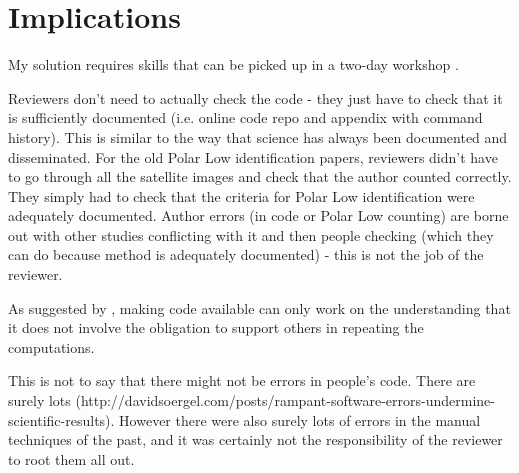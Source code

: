 \section{Implications}

My solution requires skills that can be picked up in a two-day workshop \citep{Wilson2014}.

Reviewers don't need to actually check the code - they just have to check that it is sufficiently documented (i.e. online code repo and appendix with command history). This is similar to the way that science has always been documented and disseminated. For the old Polar Low identification papers, reviewers didn't have to go through all the satellite images and check that the author counted correctly. They simply had to check that the criteria for Polar Low identification were adequately documented. Author errors (in code or Polar Low counting) are borne out with other studies conflicting with it and then people checking (which they can do because method is adequately documented) - this is not the job of the reviewer.

As suggested by \citet{Easterbrook2014}, making code available can only work on the understanding that it does not involve the obligation to support others in repeating the computations.

This is not to say that there might not be errors in people's code. There are surely lots (http://davidsoergel.com/posts/rampant-software-errors-undermine-scientific-results). However there were also surely lots of errors in the manual techniques of the past, and it was certainly not the responsibility of the reviewer to root them all out.